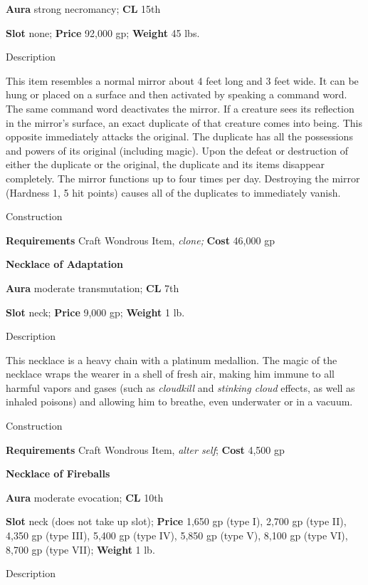 \textbf{Aura} strong necromancy;\textbf{ CL }15th
				
\textbf{Slot} none; \textbf{Price} 92,000 gp; \textbf{Weight} 45 lbs.
				
Description
				
This item resembles a normal mirror about 4 feet long and 3 feet wide. It can be hung or placed on a surface and then activated by speaking a command word. The same command word deactivates the mirror. If a creature sees its reflection in the mirror's surface, an exact duplicate of that creature comes into being. This opposite immediately attacks the original. The duplicate has all the possessions and powers of its original (including magic). Upon the defeat or destruction of either the duplicate or the original, the duplicate and its items disappear completely. The mirror functions up to four times per day. Destroying the mirror (Hardness 1, 5 hit points) causes all of the duplicates to immediately vanish.
				
Construction
				
\textbf{Requirements} Craft Wondrous Item,\textit{ clone;}\textbf{ Cost }46,000 gp
				
\textbf{Necklace of Adaptation}
				
\textbf{Aura} moderate transmutation; \textbf{CL} 7th
				
\textbf{Slot }neck; \textbf{Price} 9,000 gp; \textbf{Weight} 1 lb.
				
Description
				
This necklace is a heavy chain with a platinum medallion. The magic of the necklace wraps the wearer in a shell of fresh air, making him immune to all harmful vapors and gases (such as \textit{cloudkill }and \textit{stinking cloud }effects, as well as inhaled poisons) and allowing him to breathe, even underwater or in a vacuum.
				
Construction
				
\textbf{Requirements }Craft Wondrous Item, \textit{alter self}; \textbf{Cost} 4,500 gp
				
\textbf{Necklace of Fireballs}
				
\textbf{Aura} moderate evocation;\textbf{ CL }10th
				
\textbf{Slot} neck (does not take up slot); \textbf{Price} 1,650 gp (type I), 2,700 gp (type II), 4,350 gp (type III), 5,400 gp (type IV), 5,850 gp (type V), 8,100 gp (type VI), 8,700 gp (type VII); \textbf{Weight }1 lb.
				
Description
				
